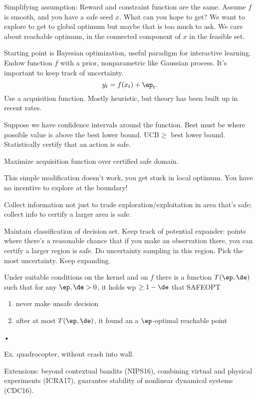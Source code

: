 Simplifying assumption: Reward and constraint function are the same. Assume $f$ is smooth, and you have a safe seed $x$. 
What can you hope to get? We want to explore to get to global optimum but maybe that is too much to ask. We care about reachable optimum, in the connected component of $x$ in the feasible set.

Starting point is Bayesian optimization, useful paradigm for interactive learning. Endow function $f$ with a prior, nonparametric like Gaussian process. It's important to keep track of uncertainty. 
$$
y_t=f(x_t)+\ep_t.
$$
Use a acquisition function. Mostly heuristic, but theory has been built up in recent rates. 

Suppose we have confidence intervals around the function. Best must be where possible value is above the best lower bound. UCB$\ge$ best lower bound.
Statistically certify that an action is safe.

Maximize acquisition function over certified safe domain.

This simple modification doesn't work, you get stuck in local optimum. You have no incentive to explore at the boundary!

Collect information not just to trade exploration/exploitation in area that's safe; collect info to certify a larger area is safe.

Maintain classification of decision set. Keep track of potential expander: points where there's a reasonable chance that if you make an observation there, you can certify a larger region is safe. Do uncertainty sampling in this region. Pick the most uncertainty. Keep expanding. 

\begin{thm}
Under suitable conditions on the kernel and on $f$ there is a function $T(\ep,\de)$ such that for any $\ep,\de>0$, it holds wp $\ge1-\de$ that  SAFEOPT
\begin{enumerate}
\item
never make unsafe decision
\item
after at most $T(\ep,\de)$, it found an a $\ep$-optimal reachable point
\end{enumerate}•
\end{thm}

Ex. quadrocopter, without crash into wall.

Extensions: beyond contextual bandits (NIPS16), combining virtual and physical experiments (ICRA17), guarantee stability of nonlinear dynamical systems (CDC16). 

